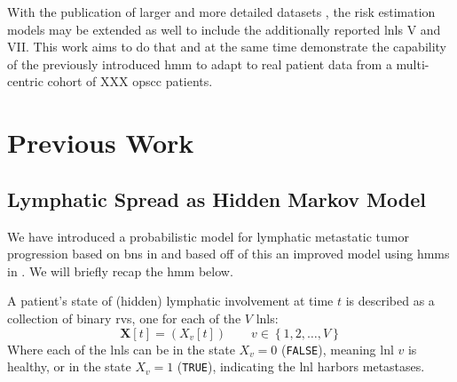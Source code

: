 \documentclass[twocolumn]{aastex631}
\begin{document}
With the publication of larger and more detailed datasets \cite{ludwig_dataset_2022}, the risk estimation models may be extended as well to include the additionally reported \glspl{lnl} V and VII. This work aims to do that and at the same time demonstrate the capability 
of the previously introduced \gls{hmm} to adapt to real patient data from a multi-centric cohort of XXX \gls{opscc} patients.

\section{Previous Work}
\label{sec:previous_work}

\subsection{Lymphatic Spread as Hidden Markov Model}
\label{subsec:previous_work:spread_as_hmm}

We have introduced a probabilistic model for lymphatic metastatic tumor progression based on \glspl{bn} in \cite{pouymayou_bayesian_2019} and based off of this an improved model using \glspl{hmm} in \cite{ludwig_hidden_2021}. We will briefly recap the \acrlong{hmm} below.

A patient's state of (hidden) lymphatic involvement at time $t$ is described as a collection of binary \glspl{rv}, one for each of the $V$ \glspl{lnl}:
%
\begin{equation}
    \mathbf{X}[t] = \left( X_v[t] \right) \qquad v \in \left\{ 1,2, \ldots, V \right\}
\end{equation}
%
Where each of the \glspl{lnl} can be in the state $X_v=0$ (\texttt{FALSE}), meaning \gls{lnl} $v$ is healthy, or in the state $X_v=1$ (\texttt{TRUE}), indicating the \gls{lnl} harbors metastases.
\end{document}
